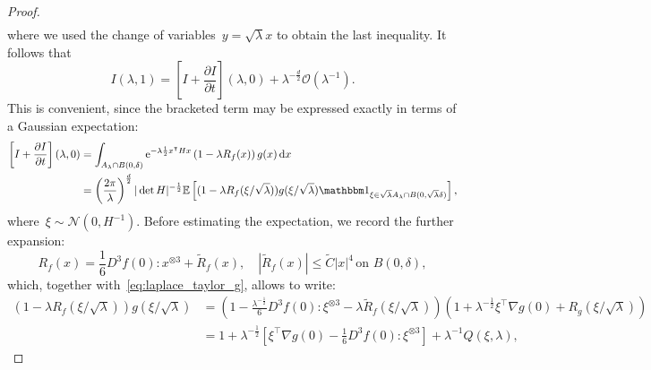 \documentclass[10pt]{article}
\renewcommand{\d}{\mathrm{d}}
\newcommand{\e}{\mathrm{e}}
\newcommand{\E}{\mathbb{E}}
\newcommand{\1}{\mathbbm 1}
\renewcommand{\O}{\mathcal{O}}
\begin{document}
\begin{proof}
\begin{equation}
\begin{aligned}
                \end{aligned}
            \end{equation}
            where we used the change of variables~$y=\sqrt\lambda x$ to obtain the last inequality.
            It follows that
            \begin{equation}
                \label{eq:laplace_expansion}
                I(\lambda,1) = \left[I + \frac{\partial I}{\partial t}\right](\lambda,0) + \lambda^{-\frac d2}\O(\lambda^{-1}).
            \end{equation}
            This is convenient, since the bracketed term may be expressed exactly in terms of a Gaussian expectation:
            \begin{equation}
                \begin{aligned}
                    \left[I + \frac{\partial I}{\partial t}\right](\lambda,0) &= \int_{A_\lambda \cap B(0,\delta)} \e^{-\lambda \frac12 x^\intercal H x}\left(1 - \lambda R_f(x)\right)g(x)\, \d x\\
                    &= \left(\frac{2\pi}{\lambda}\right)^{\frac d2}|\det H|^{-\frac12}\E\left[(1-\lambda R_f(\xi/\sqrt\lambda))g(\xi/\sqrt\lambda)\1_{\xi \in \sqrt\lambda A_\lambda \cap B(0,\sqrt\lambda \delta)}\right],
                \end{aligned}
            \end{equation}
            where~$\xi\sim\mathcal N(0,H^{-1})$.
            Before estimating the expectation, we record the further expansion:
            \begin{equation}
                \label{eq:laplace_taylor_f2}
                R_f(x) = \frac 16 D^3 f(0):x^{\otimes 3} + \widetilde R_f(x),\quad |\widetilde R_f(x)|\leq \widetilde C |x|^4\, \text{on }B(0,\delta),
            \end{equation}
            which, together with~\eqref{eq:laplace_taylor_g}, allows to write:
            \begin{equation}
                \begin{aligned}
                    (1-\lambda R_f(\xi/\sqrt\lambda))g(\xi/\sqrt\lambda) &= \left(1- \frac {\lambda^{-\frac12}}6 D^3 f(0):\xi^{\otimes 3} - \lambda\widetilde R_f(\xi/\sqrt\lambda)\right)\left(1 + \lambda^{-\frac12}\xi^\intercal \nabla g(0) + R_g(\xi/\sqrt\lambda)\right)\\
                    &= 1 + \lambda^{-\frac12}\left[\xi^\intercal \nabla g(0)-\frac16 D^3 f(0):\xi^{\otimes 3}\right] + \lambda^{-1} Q(\xi,\lambda),
                \end{aligned}

\end{equation}
\end{proof}
\end{document}
